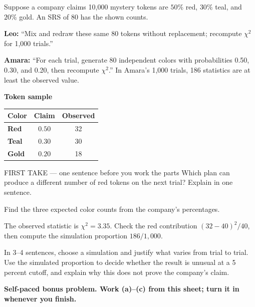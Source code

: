 \documentclass[14pt]{extarticle}
\begin{document}
\pagestyle{empty}


\noindent\begin{minipage}[t]{0.57\linewidth}
\vspace{0pt}
Suppose a company claims 10{,}000 mystery tokens are $50\%$ red, $30\%$ teal, and $20\%$ gold. An SRS of 80 has the shown counts.\par\smallskip \textbf{Leo:} ``Mix and redraw these same 80 tokens without replacement; recompute $\chi^2$ for 1,000 trials.''\par \textbf{Amara:} ``For each trial, generate 80 independent colors with probabilities 0.50, 0.30, and 0.20, then recompute $\chi^2$.'' In Amara's 1,000 trials, 186 statistics are at least the observed value.\par
\end{minipage}\hfill
\begin{minipage}[t]{0.40\linewidth}
\vspace{0pt}
\begin{center}
\textbf{Token sample}\par\smallskip
\begin{tabular}{|l|c|c|}
\hline
\textbf{Color} & \textbf{Claim} & \textbf{Observed} \\ \hline
\textbf{Red} & $0.50$ & 32 \\ \hline
\textbf{Teal} & $0.30$ & 30 \\ \hline
\textbf{Gold} & $0.20$ & 18 \\ \hline
\end{tabular}
\end{center}
\end{minipage}

\begin{firsttakebox}{FIRST TAKE --- one sentence before you work the parts}
Which plan can produce a different number of red tokens on the next trial? Explain in one sentence.
\end{firsttakebox}

\begin{description}[leftmargin=1.15in, labelwidth=1in, itemsep=2pt, topsep=2pt]
  \item[\dokbadge{1}~(a)] Find the three expected color counts from the company's percentages.
  \item[\dokbadge{2}~(b)] The observed statistic is $\chi^2=3.35$. Check the red contribution $(32-40)^2/40$, then compute the simulation proportion $186/1{,}000$.
  \item[\dokbadge{3}~(c)] In 3--4 sentences, choose a simulation and justify what varies from trial to trial. Use the simulated proportion to decide whether the result is unusual at a 5 percent cutoff, and explain why this does not prove the company's claim.
\end{description}

\vfill
\textbf{Self-paced bonus problem. Work (a)--(c) from this sheet; turn it in whenever you finish.}
\end{document}
